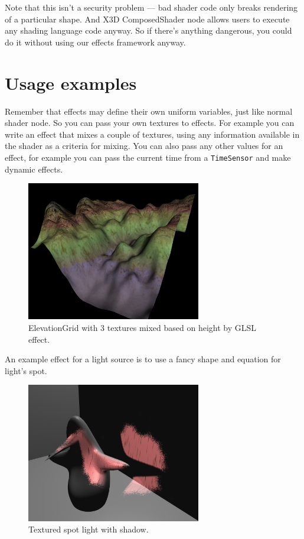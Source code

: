 \documentclass{acmsiggraph}                     %
\begin{document}
Note that this isn't a security problem --- bad shader code only breaks
rendering of a particular shape. And X3D ComposedShader node allows users
to execute any shading language code anyway. So if there's anything dangerous,
you could do it without using our effects framework anyway.

\section{Usage examples}

Remember that effects may define their own uniform variables,
just like normal shader node. So you can pass your own textures
to effects. For example you can write an effect that mixes a couple of textures,
using any information available in the shader as a criteria for mixing.
You can also pass any other values for an effect, for example you can
pass the current time from a \texttt{TimeSensor} and make dynamic effects.

\begin{figure}[H]
  \centering
  \includegraphics[width=3in]{terrain}
  \caption{ElevationGrid with 3 textures mixed based on height by GLSL effect.}
\end{figure}

An example effect for a light source is to use a fancy shape and equation
for light's spot.

\begin{figure}[H]
  \centering
  \includegraphics[width=3in]{fancy_light_spot_shape}
  \caption{Textured spot light with shadow.}
\end{figure}
\end{document}
